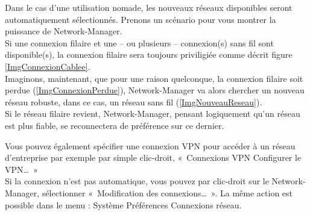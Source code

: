\begin{nota}
Dans le cas d'une utilisation nomade, les nouveaux réseaux disponibles seront automatiquement sélectionnés. Prenons un scénario pour vous montrer la puissance de Network-Manager.\\
Si une connexion filaire et une -- ou plusieurs -- connexion(s) sans fil sont disponible(s), la connexion filaire sera toujours priviligiée comme décrit figure \ref{ImgConnexionCablee}.\\
Imaginons, maintenant, que pour une raison quelconque, la connexion filaire soit perdue (\ref{ImgConnexionPerdue}), Network-Manager va alors chercher un nouveau réseau robuste, dans ce cas, un réseau sans fil (\ref{ImgNouveauReseau}).\\
Si le réseau filaire revient, Network-Manager, pensant logiquement qu'un réseau  est plus fiable, se reconnectera de préférence sur ce dernier.\par
\GestionReseauNM
\end{nota}
Vous pouvez également spécifier une connexion VPN pour accéder à un réseau d'entreprise par exemple par simple clic-droit, «~Connexions VPN \FlecheDroite Configurer le VPN\ldots{}~»\\
Si la connexion n'est pas automatique, vous pouvez par clic-droit sur le Network-Manager, sélectionner «~Modification des connexions\ldots{}~». La même action est possible dans le menu : Système \FlecheDroite Préférences \FlecheDroite Connexions réseau.
